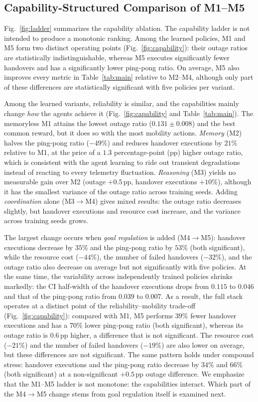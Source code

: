 \documentclass[journal]{IEEEtran}
\begin{document}
\subsection{Capability-Structured Comparison of M1--M5}
\label{sec:ladder}
Fig.~\ref{fig:ladder} summarizes the capability ablation.
The capability ladder is not intended to produce a monotonic ranking.
Among the learned policies, M1 and M5 form two distinct operating points
(Fig.~\ref{fig:capability}): their outage ratios are statistically
indistinguishable, whereas M5 executes significantly fewer handovers
and has a significantly lower ping-pong ratio. On average, M5
also improves every metric in Table~\ref{tab:main} relative to M2--M4,
although only part of these differences are statistically significant
with five policies per variant.

Among the learned variants, reliability is similar, and the capabilities
mainly change \emph{how} the agents achieve it (Fig.~\ref{fig:capability}
and Table~\ref{tab:main}). The memoryless M1 attains the lowest outage ratio
($0.131\pm0.008$) and the best common reward, but it does so with the most
mobility actions. \emph{Memory} (M2) halves the ping-pong ratio ($-49\%$) and
reduces handover executions by $21\%$ relative to M1, at the price of a
$1.3$ percentage-point (pp) higher outage ratio, which is consistent with the
agent learning to ride out transient degradations instead of reacting to
every telemetry fluctuation. \emph{Reasoning} (M3) yields no measurable gain
over M2 (outage $+0.5$\,pp, handover executions $+10\%$), although it has the
smallest variance of the outage ratio across training seeds. Adding
\emph{coordination} alone (M3$\to$M4) gives mixed results: the outage ratio
decreases slightly, but handover executions and resource cost increase, and
the variance across training seeds grows.

The largest change occurs when \emph{goal regulation} is added (M4$\to$M5):
handover executions decrease by $35\%$ and the ping-pong ratio by $53\%$
(both significant), while the resource cost ($-44\%$), the number of failed
handovers ($-32\%$), and the outage ratio also decrease on average but not
significantly with five policies. At the same time, the variability across
independently trained policies shrinks markedly: the CI half-width of the
handover executions drops from $0.115$ to $0.046$ and that of the ping-pong
ratio from $0.039$ to $0.007$. As a result, the full stack operates at a
distinct point of the reliability--mobility trade-off (Fig.~\ref{fig:capability}):
compared with M1, M5 performs $39\%$ fewer handover executions and has a
$70\%$ lower ping-pong ratio (both significant), whereas its outage ratio
is $0.6$\,pp higher, a difference that is not significant. The
resource cost ($-21\%$) and the number of failed handovers ($-19\%$) are
also lower on average, but these differences are not significant. The same pattern holds under compound stress:
handover executions and the ping-pong ratio decrease by $34\%$ and $66\%$
(both significant) at a non-significant $+0.5$\,pp outage difference. We
emphasize that the M1--M5 ladder is not monotone: the capabilities interact.
Which part of the M4$\to$M5 change stems from goal regulation itself is
examined next.
\end{document}
